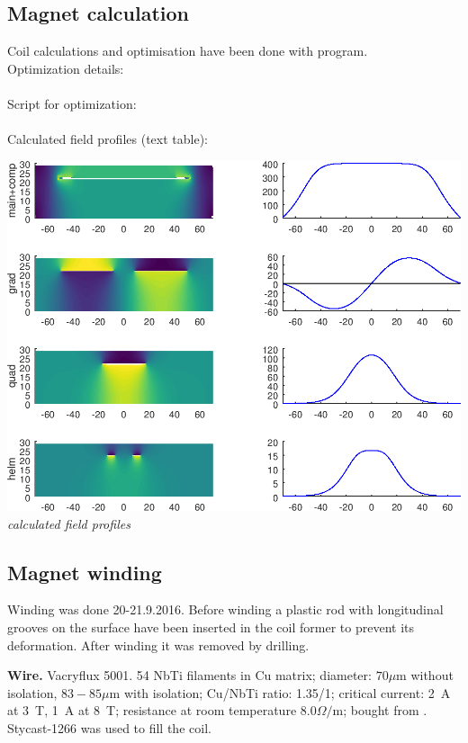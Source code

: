 \documentclass[a4paper]{article}
\begin{document}
\subsection*{Magnet calculation}
Coil calculations and optimisation have been done with \MagnettiProg{} program.\\
Optimization details:\\
\\
Script for optimization:\\
\\
Calculated field profiles (text table):\\

\vbox{\noindent
\includegraphics[width=\linewidth]{img/field_prof.png}\\
{\it calculated field profiles}}

\subsection*{Magnet winding}

Winding was done 20-21.9.2016. Before winding a plastic rod with
longitudinal grooves on the surface have been inserted in the coil former
to prevent its deformation. After winding it was removed by drilling.

{\bf Wire.} Vacryflux 5001. 54 NbTi filaments in Cu matrix; diameter:
$70\mu$m without isolation, $83-85\mu$m with isolation; Cu/NbTi ratio:
1.35/1; critical current: 2~A at 3~T, 1~A at 8~T; resistance at room
temperature $8.0\Omega/$m; bought from \Bruker. Stycast-1266 was used to
fill the coil.
\end{document}
